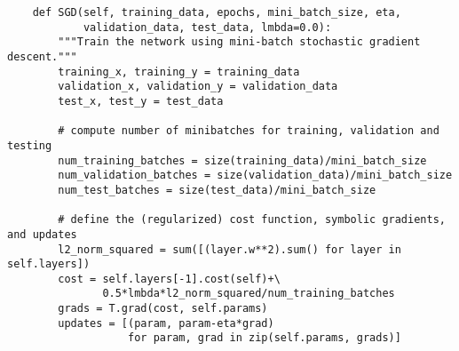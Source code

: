 \begin{lstlisting}
    def SGD(self, training_data, epochs, mini_batch_size, eta,
            validation_data, test_data, lmbda=0.0):
        """Train the network using mini-batch stochastic gradient descent."""
        training_x, training_y = training_data
        validation_x, validation_y = validation_data
        test_x, test_y = test_data

        # compute number of minibatches for training, validation and testing
        num_training_batches = size(training_data)/mini_batch_size
        num_validation_batches = size(validation_data)/mini_batch_size
        num_test_batches = size(test_data)/mini_batch_size

        # define the (regularized) cost function, symbolic gradients, and updates
        l2_norm_squared = sum([(layer.w**2).sum() for layer in self.layers])
        cost = self.layers[-1].cost(self)+\
               0.5*lmbda*l2_norm_squared/num_training_batches
        grads = T.grad(cost, self.params)
        updates = [(param, param-eta*grad)
                   for param, grad in zip(self.params, grads)]


\end{lstlisting}
